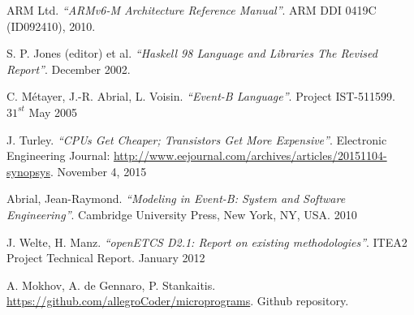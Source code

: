 \documentclass[conference]{IEEEtran}
\begin{document}
\begin{thebibliography}{10}
	ARM Ltd. \emph{``ARMv6-M Architecture Reference Manual''}. 
	ARM DDI 0419C (ID092410), 2010.
	
	S. P. Jones (editor) et al.
	\emph{``Haskell 98 Language and Libraries The Revised Report''}.
	December 2002.
	
	C. Métayer, J.-R. Abrial, L. Voisin. \emph{``Event-B Language''}. 
	Project IST-511599. $31^{st}$ May 2005
	
	J. Turley. \emph{``CPUs Get Cheaper; Transistors Get More Expensive''}. Electronic
	Engineering Journal: \url{http://www.eejournal.com/archives/articles/20151104-synopsys}.
	November 4, 2015
	
    Abrial, Jean-Raymond. \emph{``Modeling in Event-B: System and Software Engineering''}.
    Cambridge University Press, New York, NY, USA.
    2010
    
	J. Welte, H. Manz. \emph{``openETCS D2.1: Report on existing methodologies''}.
	ITEA2 Project Technical Report.
	January 2012
	
	A. Mokhov, A. de Gennaro, P. Stankaitis. \url{https://github.com/allegroCoder/microprograms}. Github repository.
    
\end{thebibliography}
\end{document}
